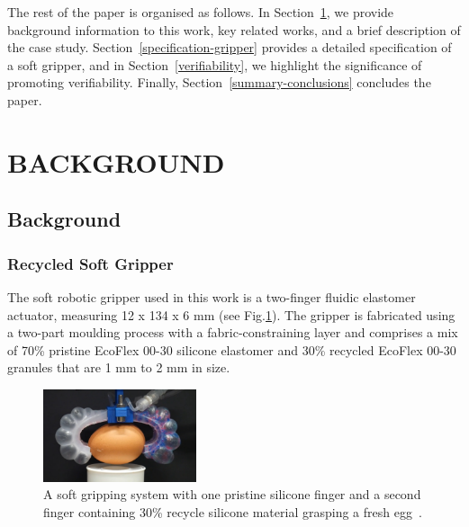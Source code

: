 \documentclass[letterpaper, 10 pt, conference]{ieeeconf}  %
\begin{document}
	The rest of the paper is organised as follows. 
	In Section~\ref{background-relatedwork}, we provide background information to this work, key related works, and a brief description of the case study. %
	Section~\ref{specification-gripper} provides a detailed specification of a soft gripper, and in Section~\ref{verifiability}, we highlight the significance of promoting verifiability.
	Finally, Section~\ref{summary-conclusions} concludes the paper. 	
	
	\section{BACKGROUND}\label{background-relatedwork}
	
	\subsection{Background}\label{background}
	\subsubsection{Recycled Soft Gripper}
	The soft robotic gripper used in this work is a two-finger fluidic elastomer actuator, measuring 12 x 134 x 6 mm \cite{Partridge2022} (see Fig.\ref{gripper}). The gripper is fabricated using a two-part moulding process with a fabric-constraining layer and comprises a mix of 70\% pristine EcoFlex 00-30 silicone elastomer and 30\% recycled EcoFlex 00-30 granules that are 1 mm to 2 mm in size.%
	
	\begin{figure}
		\centering
		\includegraphics[width=0.4\textwidth]{figures/recycledsoftgripper.jpg}%
		\caption{A soft gripping system with one pristine silicone finger and a second finger containing 30\% recycle silicone material grasping a fresh egg~\cite{Partridge2022}.}
		\label{gripper}
	\end{figure}
	
\end{document}
